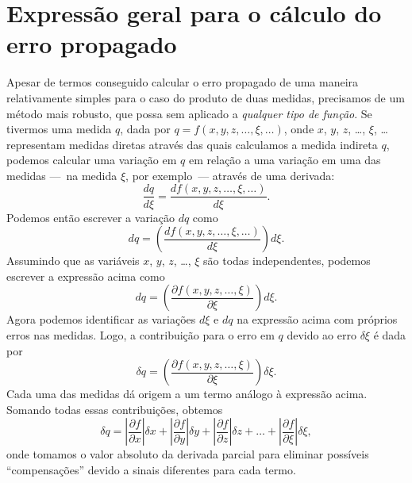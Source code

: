 \section{Expressão geral para o cálculo do erro propagado}
Apesar de termos conseguido calcular o erro propagado de uma maneira relativamente simples para o caso do produto de duas medidas, precisamos de um método mais robusto, que possa sem aplicado a \emph{qualquer tipo de função}. Se tivermos uma medida $q$, dada por $q=f(x,y,z,\dots,\xi,\dots)$, onde $x$, $y$, $z$, \dots, $\xi$, \dots representam medidas diretas através das quais calculamos a medida indireta $q$, podemos calcular uma variação em $q$ em relação a uma variação em uma das medidas ---~na medida $\xi$, por exemplo~--- através de uma derivada:
\begin{equation}
	\frac{dq}{d\xi} = \frac{df(x,y,z,\dots,\xi,\dots)}{d\xi}.
\end{equation}
%
Podemos então escrever a variação $dq$ como 
\begin{equation}
	dq = \left(\frac{df(x,y,z,\dots,\xi,\dots)}{d\xi}\right)d\xi.
\end{equation}
%
Assumindo que as variáveis $x$, $y$, $z$, \dots, $\xi$ são todas independentes, podemos escrever a expressão acima como
\begin{equation}
    dq = \left(\frac{\partial f(x,y,z,\dots,\xi)}{\partial \xi}\right)d\xi.
\end{equation}
%
Agora podemos identificar as variações $d\xi$ e $dq$ na expressão acima com próprios erros nas medidas. Logo, a contribuição para o erro em $q$ devido ao erro $\delta\xi$ é dada por
\begin{equation}
    \delta q = \left(\frac{\partial f(x,y,z,\dots,\xi)}{\partial \xi}\right)\delta\xi.
\end{equation}
%
Cada uma das medidas dá origem a um termo análogo à expressão acima. Somando todas essas contribuições, obtemos
\begin{equation}\label{Eq:ErroGeral}
	\delta q = \left|\frac{\partial f}{\partial x}\right| \delta x + \left|\frac{\partial f}{\partial y}\right| \delta y + \left|\frac{\partial f}{\partial z}\right| \delta z + \dots + \left|\frac{\partial f}{\partial \xi}\right| \delta\xi,
\end{equation}
%
onde tomamos o valor absoluto da derivada parcial para eliminar possíveis ``compensações'' devido a sinais diferentes para cada termo.

